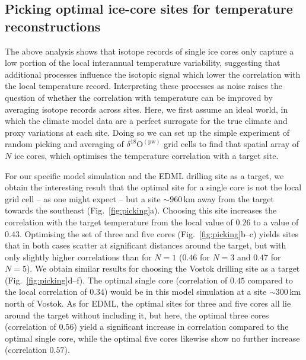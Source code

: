 \documentclass[cp, manuscript]{copernicus}
\begin{document}
\subsection{Picking optimal ice-core sites for temperature reconstructions}
\label{results:picking}

The above analysis shows that isotope records of single ice cores only capture a
low portion of the local interannual temperature variability, suggesting that
additional processes influence the isotopic signal which lower the correlation
with the local temperature record. Interpreting these processes as noise raises
the question of whether the correlation with temperature can be improved by
averaging isotope records across sites. Here, we first assume an ideal world, in
which the climate model data are a perfect surrogate for the true climate and
proxy variations at each site. Doing so we can set up the simple experiment of
random picking and averaging of $\delta^{18}\mathrm{O}^{\mathrm{(pw)}}$ grid
cells to find that spatial array of $N$ ice cores, which optimises the
temperature correlation with a target site.

For our specific model simulation and the EDML drilling site as a target, we
obtain the interesting result that the optimal site for a single core is not the
local grid cell -- as one might expect -- but a site $\sim960$\,km away from the
target towards the southeast (Fig.~\ref{fig:picking}a). Choosing this site
increases the correlation with the target temperature from the local value of
$0.26$ to a value of $0.43$. Optimising the set of three and five cores
(Fig.~\ref{fig:picking}b--c) yields sites that in both cases scatter at
significant distances around the target, but with only slightly higher
correlations than for $N=1$ ($0.46$ for $N=3$ and $0.47$ for $N=5$). We obtain
similar results for choosing the Vostok drilling site as a target
(Fig.~\ref{fig:picking}d--f). The optimal single core (correlation of $0.45$
compared to the local correlation of $0.34$) would be in this model simulation
at a site $\sim300$\,km north of Vostok. As for EDML, the optimal sites for
three and five cores all lie around the target without including it, but here,
the optimal three cores (correlation of $0.56$) yield a significant increase in
correlation compared to the optimal single core, while the optimal five cores
likewise show no further increase (correlation $0.57$).
\end{document}

